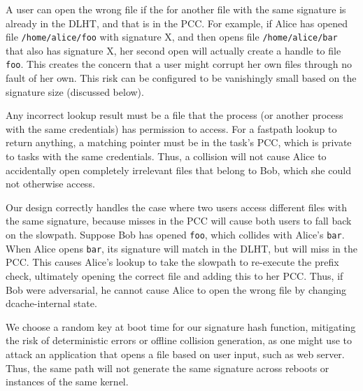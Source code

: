 A user can open the wrong file if the \dentry{} for another file 
with the same signature is already in the DLHT, and that \dentry{} is in the PCC.
For example, if Alice has opened file {\tt /home/alice/foo} with signature X,
and then opens file {\tt /home/alice/bar} that also has signature X,
her second open will actually create a handle to file {\tt foo}.
This creates the concern that a user might corrupt her own files through no fault of her own.  
This risk can be configured to be vanishingly small based on the signature size (discussed below).



Any incorrect lookup result must be a file that the process (or another process
with the same credentials) has permission to access.
For a fastpath lookup to return anything, a matching \dentry{} pointer must be in the task's PCC,
which is private to tasks with the same credentials.
Thus, a collision will not cause Alice to accidentally open completely irrelevant 
files that belong to Bob, which she could not otherwise access.

Our design correctly handles the case where 
two users access different files with the same signature,
because misses in the PCC will cause both users to fall back on the slowpath.
Suppose Bob has opened {\tt foo}, which collides with Alice's {\tt bar}.
When Alice opens {\tt bar}, its signature will 
match in the DLHT, but will miss in the PCC.
This causes Alice's lookup to take the slowpath
to re-execute the prefix check,
ultimately opening the correct file and adding this \dentry{} to her PCC.
Thus, if Bob were adversarial, he cannot cause 
Alice to open the wrong file by changing dcache-internal state.

We choose a random key at boot time for our signature hash function,
mitigating the risk of deterministic errors or offline collision generation,
as one might use to attack an application that opens a file based on user input, such as web server.
Thus, the same path will not generate the same signature 
across reboots or instances of the same kernel.

